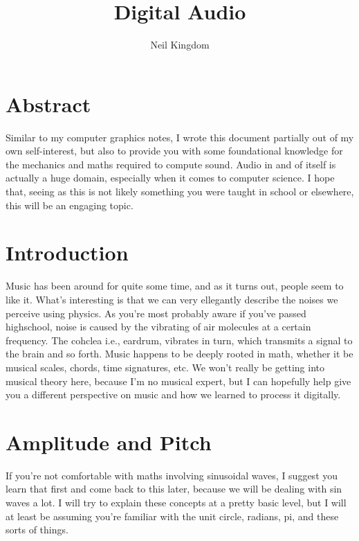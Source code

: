 \documentclass{article}
\title{Digital Audio}
\author{Neil Kingdom}
\begin{document}
\begin{titlingpage}

\maketitle

\end{titlingpage}

\newpage

\tableofcontents

\newpage

\section{Abstract}

Similar to my computer graphics notes, I wrote this document partially out of my own self-interest, but also
to provide you with some foundational knowledge for the mechanics and maths required to compute sound. Audio
in and of itself is actually a huge domain, especially when it comes to computer science. I hope that, seeing
as this is not likely something you were taught in school or elsewhere, this will be an engaging topic.

\section{Introduction}

Music has been around for quite some time, and as it turns out, people seem to like it. What's interesting is
that we can very ellegantly describe the noises we perceive using physics. As you're most probably aware if
you've passed highschool, noise is caused by the vibrating of air molecules at a certain frequency. The
cohclea i.e., eardrum, vibrates in turn, which transmits a signal to the brain and so forth. Music happens to
be deeply rooted in math, whether it be musical scales, chords, time signatures, etc. We won't really be
getting into musical theory here, because I'm no musical expert, but I can hopefully help give you a different
perspective on music and how we learned to process it digitally.

\section{Amplitude and Pitch}

If you're not comfortable with maths involving sinusoidal waves, I suggest you learn that first and come back
to this later, because we will be dealing with sin waves a lot. I will try to explain these concepts at a
pretty basic level, but I will at least be assuming you're familiar with the unit circle, radians, pi, and these
sorts of things.
\end{document}
